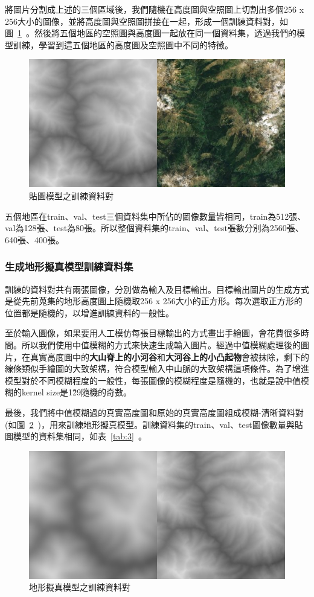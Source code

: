 \documentclass[a4paper, 12pt]{article}
\begin{document}
將圖片分割成上述的三個區域後，我們隨機在高度圖與空照圖上切割出多個256 x 256大小的圖像，並將高度圖與空照圖拼接在一起，形成一個訓練資料對，如圖~\ref{fig:9}~。然後將五個地區的空照圖與高度圖一起放在同一個資料集，透過我們的模型訓練，學習到這五個地區的高度圖及空照圖中不同的特徵。

\begin{figure}[htbp]
    \centering
    \includegraphics[width=0.5\linewidth]{fig/9.jpg}
    \caption{貼圖模型之訓練資料對}
    \label{fig:9}
\end{figure}

五個地區在train、val、test三個資料集中所佔的圖像數量皆相同，train為512張、val為128張、test為80張。所以整個資料集的train、val、test張數分別為2560張、640張、400張。

\subsubsection{生成地形擬真模型訓練資料集}

訓練的資料對共有兩張圖像，分別做為輸入及目標輸出。目標輸出圖片的生成方式是從先前蒐集的地形高度圖上隨機取256 x 256大小的正方形。每次選取正方形的位置都是隨機的，以增進訓練資料的一般性。

至於輸入圖像，如果要用人工模仿每張目標輸出的方式畫出手繪圖，會花費很多時間。所以我們使用中值模糊的方式來快速生成輸入圖片。經過中值模糊處理後的圖片，在真實高度圖中的\textbf{大山脊上的小河谷}和\textbf{大河谷上的小凸起物}會被抹除，剩下的線條類似手繪圖的大致架構，符合模型輸入中山脈的大致架構這項條件。為了增進模型對於不同模糊程度的一般性，每張圖像的模糊程度是隨機的，也就是說中值模糊的kernel size是1\~ 29隨機的奇數。

最後，我們將中值模糊過的真實高度圖和原始的真實高度圖組成模糊-清晰資料對(如圖~\ref{fig:10}~)，用來訓練地形擬真模型。訓練資料集的train、val、test圖像數量與貼圖模型的資料集相同，如表~\ref{tab:3}~。

\begin{figure}[htbp]
    \centering
    \includegraphics[width=0.5\linewidth]{fig/10.jpg}
    \caption{地形擬真模型之訓練資料對}
    \label{fig:10}
\end{figure}
\end{document}
